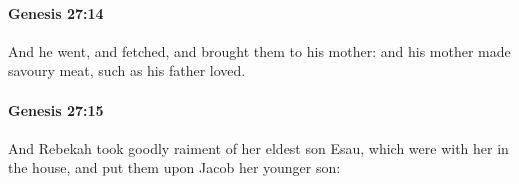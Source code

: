		\paragraph{Genesis 27:14} %
			\label{GENESIS-27-14}

			And he went, and fetched, and brought them to his mother: and his mother made savoury meat, such as his father loved.


		\paragraph{Genesis 27:15} %
			\label{GENESIS-27-15}

			And Rebekah took goodly raiment of her eldest son Esau, which were with her in the house, and put them upon Jacob her younger son:


